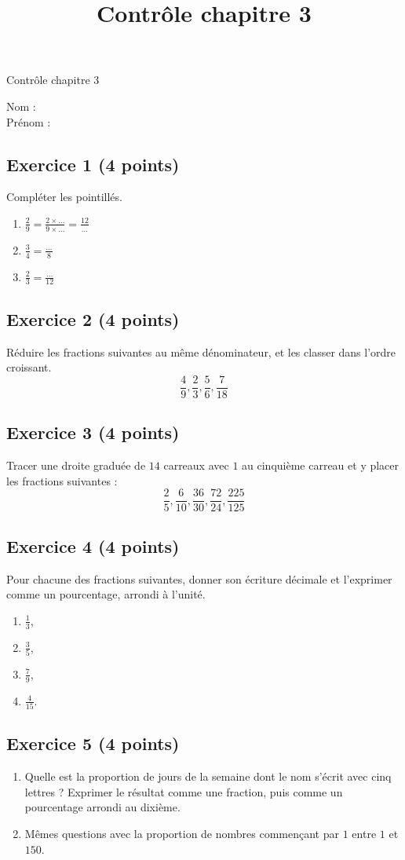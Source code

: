 \documentclass[14 pt]{extarticle}
\title{Contrôle chapitre 3}
\date{}
\theoremstyle{plain}
\begin{document}
\begin{center}{\Large Contrôle chapitre 3}\\ 
 \end{center}
 Nom : \\
 Prénom : 
 \subsection*{Exercice 1 (4 points)}
 
Compléter les pointillés.
\begin{enumerate}
\item $\frac29=\frac{2\times \ldots}{9\times \ldots} = \frac{12}\ldots$
\item $\frac34=\frac\ldots{8}$
\item $\frac23=\frac{\ldots}{12}$
\end{enumerate}

\subsection*{Exercice 2 (4 points)}
Réduire les fractions suivantes au même dénominateur, et les classer dans l'ordre croissant. 
\[ \frac49, \frac23, \frac56, \frac7{18}\]
\subsection*{Exercice 3 (4 points)}

Tracer une droite graduée de $14$ carreaux avec $1$ au cinquième carreau et y placer les fractions suivantes : 
\[ \frac25, \frac6{10}, \frac{36}{30}, \frac{72}{24}, \frac{225}{125}\]

\subsection*{Exercice 4 (4 points)}

Pour chacune des fractions suivantes, donner son écriture décimale et l'exprimer comme un pourcentage, arrondi à l'unité. 
\begin{enumerate}
\item $\frac13$,
\item $\frac35$,
\item $\frac79$,
\item $\frac{4}{15}$. 
\end{enumerate}

\subsection*{Exercice 5 (4 points)}
\begin{enumerate}
\item Quelle est la proportion de jours de la semaine dont le nom s'écrit avec cinq lettres ? Exprimer le résultat comme une fraction, puis comme un pourcentage arrondi au dixième. 
\item Mêmes questions avec la proportion de nombres commençant par $1$ entre $1$ et $150$. \end{enumerate}

 	
\end{document}
